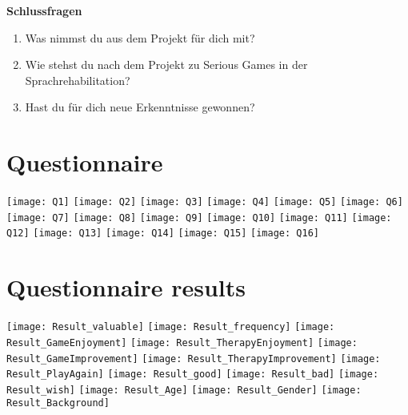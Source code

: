 \documentclass[draft,final]{vutinfth} %
\begin{document}
\textbf{Schlussfragen}
\begin{enumerate}
\item Was nimmst du aus dem Projekt für dich mit?
\item Wie stehst du nach dem Projekt zu Serious Games in der Sprachrehabilitation?
\item Hast du für dich neue Erkenntnisse gewonnen?
\end{enumerate}
\section{Questionnaire}
  \centering
  \texttt{[image: Q1]}
  \texttt{[image: Q2]}
  \texttt{[image: Q3]}
  \texttt{[image: Q4]}
  \texttt{[image: Q5]}
  \texttt{[image: Q6]}
  \texttt{[image: Q7]}
  \texttt{[image: Q8]}
  \texttt{[image: Q9]}
  \texttt{[image: Q10]}
  \texttt{[image: Q11]}
  \texttt{[image: Q12]}
  \texttt{[image: Q13]}
  \texttt{[image: Q14]}
  \texttt{[image: Q15]}
  \texttt{[image: Q16]}
  
\section{Questionnaire results}
  \centering
  \texttt{[image: Result\_valuable]}
  \texttt{[image: Result\_frequency]}
  \texttt{[image: Result\_GameEnjoyment]}
  \texttt{[image: Result\_TherapyEnjoyment]}
  \texttt{[image: Result\_GameImprovement]}
  \texttt{[image: Result\_TherapyImprovement]}
  \texttt{[image: Result\_PlayAgain]}
  \texttt{[image: Result\_good]}
  \texttt{[image: Result\_bad]}
  \texttt{[image: Result\_wish]}
  \texttt{[image: Result\_Age]}
  \texttt{[image: Result\_Gender]}
  \texttt{[image: Result\_Background]}
\end{document}
